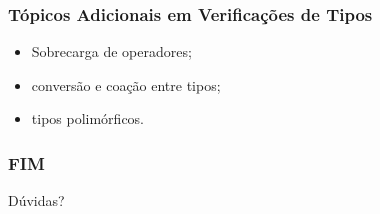 \documentclass[table]{beamer}
\begin{document}
\begin{frame}
   \frametitle{Tópicos Adicionais em Verificações de Tipos}
   \begin{itemize}
      \item Sobrecarga de operadores;
      \item conversão e coação entre tipos;
      \item tipos polimórficos.
   \end{itemize}
\end{frame}

\begin{frame}
   \frametitle{FIM}
   Dúvidas?
\end{frame}
\end{document}
